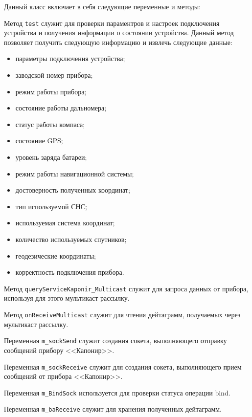 Данный класс включает в себя следующие переменные и методы:
\begin{enum}
	\item Метод \texttt{test} служит для проверки параментров и настроек подключения устройства и получения
		информации о состоянии устройства. Данный метод позволяет получить следующую информацию и извлечь
		следующие данные:
		\begin{itemize}
			\item параметры подключения устройства;
			\item заводской номер прибора;
			\item режим работы прибора;
			\item состояние работы дальномера;
			\item статус работы компаса;
			\item состояние GPS;
			\item уровень заряда батареи;
			\item режим работы навигационной системы;
			\item достоверность полученных координат;
			\item тип используемой СНС;
			\item используемая система координат;
			\item количество используемых спутников;
			\item геодезические координаты;
			\item корректность подключения прибора.
		\end{itemize}

	\item Метод \texttt{queryServiceKaponir\_Multicast} служит для запроса данных от прибора, используя для этого
		мультикаст рассылку.

	\item Метод \texttt{onReceiveMulticast} служит для чтения дейтаграмм, получаемых через мультикаст рассылку.

	\item Переменная \texttt{m\_sockSend} служит создания сокета, выполняющего отправку сообщений прибору
		<<Капонир>>.

	\item Переменная \texttt{m\_sockReceive} служит для создания сокета, выполняющего прием сообщений от прибора
		<<Капонир>>.

	\item Переменная \texttt{m\_BindSock} используется для проверки статуса операции bind.

	\item Переменная \texttt{m\_baReceive} служит для хранения полученных дейтаграмм.
\end{enum}
